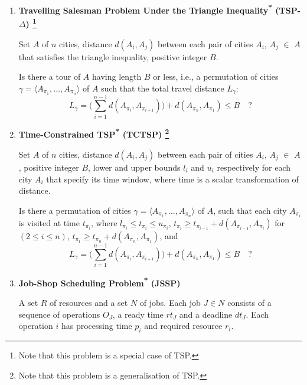\documentclass{mprop}
\theoremstyle{definition}
\begin{document}
\begin{enumerate}
\item \textbf{Travelling Salesman Problem Under the Triangle Inequality\textsuperscript{*} (TSP-$\Delta$) \footnote{Note that this problem is a special case of TSP.}}
\begin{instance}
Set $A$ of $n$ cities, distance $d(A_{i}, A_{j})$ between each pair of cities $A_{i}$, $A_{j}$ $\in$ $A$ that satisfies the triangle inequality, positive integer $B$.
\end{instance}

\begin{question}
Is there a tour of $A$ having length $B$ or less, i.e., a permutation of cities $\gamma = \langle A_{\pi_{1}},...,A_{\pi_{n}} \rangle $ of $A$ such that the total travel distance $L_{\gamma}$:
$$L_{\gamma} = \bigg( \sum_{i=1}^{n-1} d(A_{\pi_{i}}, A_{\pi_{i+1}}) \bigg) + d(A_{\pi_{n}}, A_{\pi_{1}}) \leq B \quad \textrm{?}$$
\end{question}

\item \textbf{Time-Constrained TSP\textsuperscript{*} (TCTSP) \footnote{Note that this problem is a generalisation of TSP.}}

\begin{instance}
Set $A$ of $n$ cities, distance $d(A_{i}, A_{j})$ between each pair of cities $A_{i}$, $A_{j}$ $\in$ $A$, positive integer $B$, lower and upper bounds $l_{i}$ and $u_{i}$ respectively for each city $A_{i}$ that specify its time window, where time is a scalar transformation of distance.
\end{instance}

\begin{question}
Is there a permutation of cities $\gamma = \langle A_{\pi_{1}},...,A_{\pi_{n}} \rangle$ of $A$, such that each city $A_{\pi_{i}}$ is visited at time $t_{\pi_{i}}$, where $l_{\pi_{i}} \leq t_{\pi_{i}} \leq u_{\pi_{i}}$, $t_{\pi_{i}} \geq t_{\pi_{i-1}} + d(A_{\pi_{i-1}},A_{\pi_{i}})$ for $(2 \leq i \leq n)$, $t_{\pi_{1}} \geq t_{\pi_{n}} + d(A_{\pi_{n}},A_{\pi_{1}})$,
 and 
$$L_{\gamma} = \bigg( \sum_{i=1}^{n-1} d(A_{\pi_{i}}, A_{\pi_{i+1}}) \bigg) + d(A_{\pi_{n}}, A_{\pi_{1}}) \leq B \quad \textrm{?}$$

\end{question}

\item \textbf{Job-Shop Scheduling Problem\textsuperscript{*} (JSSP)}
\begin{instance}
A set $R$ of resources and a set $N$ of jobs. Each job $J \in N$ consists of a sequence of operations $O_{J}$, a ready time $rt_{J}$ and a deadline $dt_{J}$. Each operation $i$ has processing time $p_{i}$ and required resource $r_{i}$.
\end{instance}


\end{enumerate}
\end{document}
